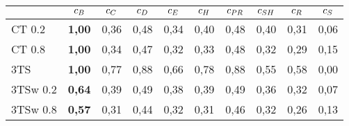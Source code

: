 \begin{tabular}[ht]{l|c|c|c|c|c|c|c|c|c}
\hline
\hline
	& $c_{B}$	& $c_{C}$	& $c_{D}$	& $c_{E}$ & $c_{H}$	& $c_{PR}$ & $c_{SH}$ & $c_{R}$ & $c_{S}$\\
	\hline
CT 0.2		& \textbf{1,00} & 0,36 & 0,48 & 0,34 & 0,40 & 0,48 & 0,40 & 0,31 & 0,06\\
CT 0.8		& \textbf{1,00} & 0,34 & 0,47 & 0,32 & 0,33 & 0,48 & 0,32 & 0,29 & 0,15\\
3TS	 		& \textbf{1,00} & 0,77 & 0,88 & 0,66 & 0,78 & 0,88 & 0,55 & 0,58 & 0,00\\
3TSw 0.2	& \textbf{0,64} & 0,39 & 0,49 & 0,38 & 0,39 & 0,49 & 0,36 & 0,32 & 0,07\\
3TSw 0.8	& \textbf{0,57} & 0,31 & 0,44 & 0,32 & 0,31 & 0,46 & 0,32 & 0,26 & 0,13\\
\hline
\hline
\end{tabular}
